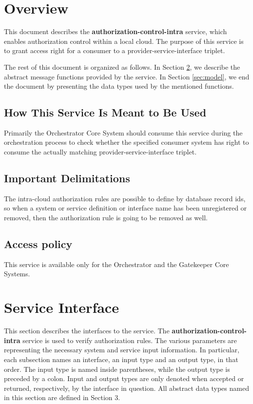 \documentclass[a4paper]{arrowhead}
\begin{document}
\section{Overview}
\label{sec:overview}
This document describes the \textbf{authorization-control-intra} service, which enables authorization control within a local cloud. The purpose of this service is to grant access right for a consumer to a provider-service-interface triplet.

The rest of this document is organized as follows.
In Section \ref{sec:functions}, we describe the abstract message functions provided by the service.
In Section \ref{sec:model}, we end the document by presenting the data types used by the mentioned functions.

\subsection{How This Service Is Meant to Be Used}
Primarily the Orchestrator Core System should consume this service during the orchestration process to check whether the specified consumer system has right to consume the actually matching provider-service-interface triplet. 

\subsection{Important Delimitations}
\label{sec:delimitations}

The intra-cloud authorization rules are possible to define by database record ids, so when a system or  service definition or interface name has been unregistered or removed, then the authorization rule is going to be removed as well.

\subsection{Access policy}
\label{sec:accesspolicy}

This service is available only for the Orchestrator and the Gatekeeper Core Systems.

\newpage

\section{Service Interface}
\label{sec:functions}

This section describes the interfaces to the service. The \textbf{authorization-control-intra} service is used to verify authorization rules. The various parameters are representing the necessary system and service input information.
In particular, each subsection names an interface, an input type and an output type, in that order.
The input type is named inside parentheses, while the output type is preceded by a colon.
Input and output types are only denoted when accepted or returned, respectively, by the interface in question. All abstract data types named in this section are defined in Section 3.
\end{document}
